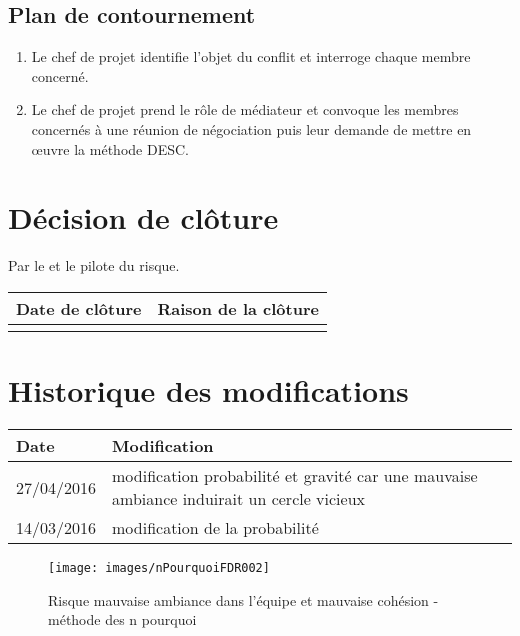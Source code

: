 \flushleft
\subsection*{Plan de contournement}

\begin{enumerate}
	\item Le chef de projet identifie l'objet du conflit et interroge chaque membre concerné.
	\item Le chef de projet prend le rôle de médiateur et convoque les membres concernés à une réunion de négociation puis leur demande de mettre en œuvre la méthode DESC.
\end{enumerate}

\section*{Décision de clôture}
Par le \CP{} et le pilote du risque.
\begin{table}[H]
\centering
	\begin{tabularx}{16.8cm}{|X|X|}
	\hline
	\rowcolor{gray!40} Date de clôture & Raison de la clôture \\
	\hline
	  & \\
	\hline
	\end{tabularx}
\end{table}

\section*{Historique des modifications}
\begin{table}[H]
\centering
	\begin{tabularx}{16.8cm}{|X|X|}
	\hline
	\rowcolor{gray!40} Date & Modification \\
	\hline
	 27/04/2016 & modification probabilité et gravité car une mauvaise ambiance induirait un cercle vicieux \\
	\hline
	 14/03/2016 & modification de la probabilité\\
	\hline
	\end{tabularx}
\end{table}
\newpage

\begin{figure}
	\centering
	\texttt{[image: images/nPourquoiFDR002]}
	\caption{\label{risque mauvaise ambiance dans l'équipe et mauvaise cohesion}Risque mauvaise ambiance dans l'équipe et mauvaise cohésion - méthode des n pourquoi}
\end{figure}
